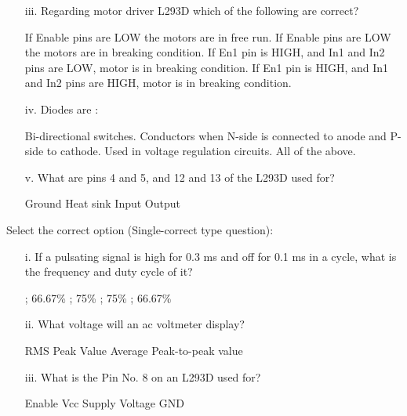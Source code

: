 \documentclass[12pt]{exam}
\begin{document}
\begin{questions}
\begin{enumerate}
\item[iii.]   Regarding motor driver L293D which of the following are correct?
\begin{choices}
\choice If Enable pins are LOW the motors are in free run.
\choice  If Enable pins are LOW the motors are in breaking condition.
\choice  If En1 pin is HIGH, and In1 and In2 pins are LOW, motor is in breaking condition.
\choice  If En1 pin is HIGH, and In1 and In2 pins are HIGH, motor is in breaking condition.
\end{choices}
\newpage

\item[iv.] Diodes are	:
\begin{choices}
\choice  Bi-directional switches.
\choice Conductors when N-side is connected to anode and P-side to cathode.
\choice Used in voltage regulation circuits.
\choice All of the above.
\end{choices}

\item[v.]  What are pins 4 and 5, and 12 and 13 of the L293D used for?
\begin{multicols}{2}
\begin{choices}
\choice Ground
\choice Heat sink
\choice Input
\choice Output
\end{choices}
\end{multicols}
\end{enumerate}

\question[5] Select the correct option (Single-correct type question):
\begin{enumerate}
\item[i.] If a pulsating signal is high for 0.3 ms and off for 0.1 ms in a cycle, what is the frequency and duty cycle of it?
\begin{multicols}{2}
\begin{choices}
 ; 66.67\% 
 ; 75\%
 ; 75\%
 ; 66.67\%
\end{choices}
\end{multicols}

\item[ii.]What voltage will an ac voltmeter display?
\begin{multicols}{2}
\begin{choices}
\choice RMS
\choice Peak Value
\choice Average
\choice Peak-to-peak value
\end{choices}
\end{multicols}

\item[iii.]What is the Pin No. 8 on an L293D used for?
\begin{multicols}{2}
\begin{choices}
\choice Enable
\choice Vcc
\choice Supply Voltage
\choice GND
\end{choices}
\end{multicols}


\end{enumerate}
\end{questions}
\end{document}
